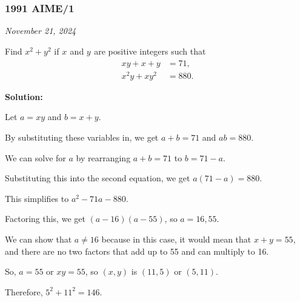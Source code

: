 \documentclass[../mathproblems.tex]{subfiles}
\begin{document}
\subsubsection*{1991 AIME/1} 
\textit{November 21, 2024}

Find $x^2+y^2_{}$ if $x_{}^{}$ and $y_{}^{}$ are positive integers such that \begin{align*} xy+x+y&=71, \\ x^2y+xy^2&=880. \end{align*}

\textbf{Solution:}

Let $a=xy$ and $b=x+y$.

By substituting these variables in, we get $a+b=71$ and $ab = 880$.

We can solve for $a$ by rearranging $a+b = 71$ to $b=71-a$.

Substituting this into the second equation, we get $a(71-a)=880$.

This simplifies to $a^2-71a-880$.

Factoring this, we get $(a-16)(a-55)$, so $a=16,55$.

We can show that $a\neq 16$ because in this case, it would mean that $x+y=55$, and there are no two factors that add up to 55 and can multiply to 16.

So, $a=55$ or $xy=55$, so $(x,y)$ is $(11,5)$ or $(5,11)$.

Therefore, $5^2+11^2=\boxed{146}$.

\noindent\hrulefill
\end{document}
